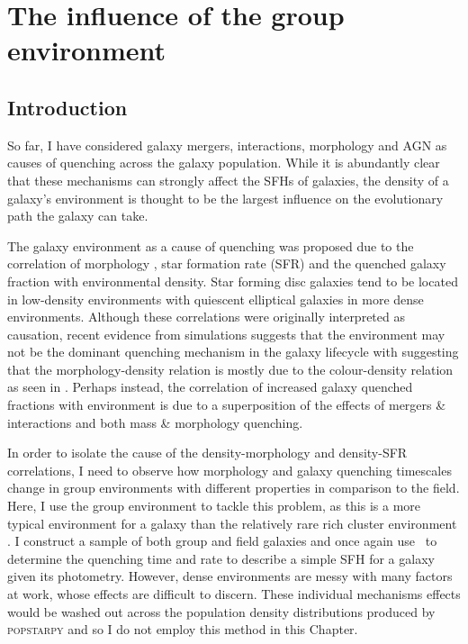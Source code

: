 \chapter{The influence of the group environment}\label{chap:env}

\section{Introduction}\label{sec:intro}
 
 So far, I have considered  galaxy mergers, interactions, morphology and AGN as causes of quenching across the galaxy population. While it is abundantly clear that these mechanisms can strongly affect the SFHs of galaxies, the density of a galaxy's environment is thought to be the largest influence on the evolutionary path the galaxy can take. 
 
 The galaxy environment as a cause of quenching was proposed due to the correlation of morphology \citep{dressler80, smail97, poggianti99, postman05, Bamford09}, star formation rate (SFR) and the quenched galaxy fraction \citep{kauffmann03, Baldry06, peng12, darvish16} with environmental density. Star forming disc galaxies tend to be located in low-density environments with quiescent elliptical galaxies in more dense environments. Although these correlations were originally interpreted as causation, recent evidence from simulations suggests that the environment may not be the dominant quenching mechanism in the galaxy lifecycle \citep{ref, ref} with \citet{Skibba09} suggesting that the morphology-density relation is mostly due to the colour-density relation as seen in \citet{pimbblet02}. Perhaps instead, the correlation of increased galaxy quenched fractions with environment is due to a superposition of the effects of mergers \& interactions and both mass \& morphology quenching. 
  
In order to isolate the cause of the density-morphology and density-SFR correlations, I need to observe how morphology and galaxy quenching timescales change in group environments with different properties in comparison to the field. Here, I use the group environment to tackle this problem, as this is a more typical environment for a galaxy than the relatively rare rich cluster environment \citep{carlberg04}. I construct a sample of both group and field galaxies and once again use \starpy\ to determine the quenching time and rate to describe a simple SFH for a galaxy given its photometry. However, dense environments are messy with many factors at work, whose effects are difficult to discern. These individual mechanisms effects would be washed out across the population density distributions produced by \textsc{popstarpy} and so I do not employ this method in this Chapter. 

